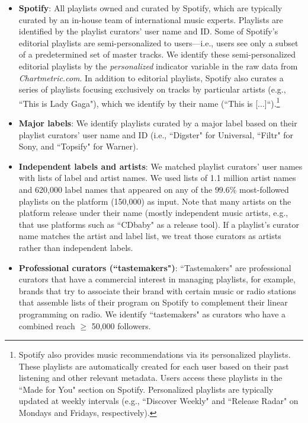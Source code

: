 \documentclass[12pt, a4paper, leqno]{article}
\begin{document}
\begin{itemize}
    \item \textbf{Spotify}: All playlists owned and curated by Spotify, which are typically curated by an in-house team of international music experts. Playlists are identified by the playlist curators' user name and ID. Some of Spotify's editorial playlists are semi-personalized to users---i.e., users see only a subset of a predetermined set of master tracks. We identify these semi-personalized editorial playlists by the \textit{personalized} indicator variable in the raw data from \textit{Chartmetric.com}. In addition to editorial playlists, Spotify also curates a series of playlists focusing exclusively on tracks by particular artists (e.g., ``This is Lady Gaga"), which we identify by their name (``This is [...]``).\footnote{Spotify also provides music recommendations via its personalized playlists. These playlists are automatically created for each user based on their past listening and other relevant metadata. Users access these playlists in the ``Made for You" section on Spotify. Personalized playlists are typically updated at weekly intervals (e.g., ``Discover Weekly" and ``Release Radar" on Mondays and Fridays, respectively).}%


    \item \textbf{Major labels}: We identify playlists curated by a major label based on their playlist curators' user name and ID (i.e., ``Digster" for Universal, ``Filtr" for Sony, and ``Topsify" for Warner).
    
    \item \textbf{Independent labels and artists}: We matched playlist curators' user names with lists of label and artist names. We used lists of 1.1 million artist names and 620,000 label names that appeared on any of the $99.6\%$ most-followed playlists on the platform (150,000) as input. Note that many artists on the platform release under their name (mostly independent music artists, e.g., that use platforms such as ``CDbaby" as a release tool). If a playlist's curator name matches the artist and label list, we treat those curators as artists rather than independent labels. 
    
     \item \textbf{Professional curators (``tastemakers")}: ``Tastemakers" are professional curators that have a commercial interest in managing playlists, for example, brands that try to associate their brand with certain music or radio stations that assemble lists of their program on Spotify to complement their linear programming on radio. We identify ``tastemakers" as curators who have a combined reach $\geq$ 50,000 followers.
     

\end{itemize}
\end{document}
